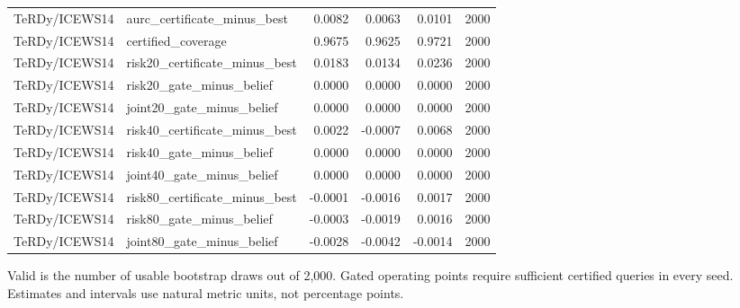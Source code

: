 \begin{longtable}{llrrrr}
TeRDy/ICEWS14 & aurc\_certificate\_minus\_best & 0.0082 & 0.0063 & 0.0101 & 2000\\
TeRDy/ICEWS14 & certified\_coverage & 0.9675 & 0.9625 & 0.9721 & 2000\\
TeRDy/ICEWS14 & risk20\_certificate\_minus\_best & 0.0183 & 0.0134 & 0.0236 & 2000\\
TeRDy/ICEWS14 & risk20\_gate\_minus\_belief & 0.0000 & 0.0000 & 0.0000 & 2000\\
TeRDy/ICEWS14 & joint20\_gate\_minus\_belief & 0.0000 & 0.0000 & 0.0000 & 2000\\
TeRDy/ICEWS14 & risk40\_certificate\_minus\_best & 0.0022 & -0.0007 & 0.0068 & 2000\\
TeRDy/ICEWS14 & risk40\_gate\_minus\_belief & 0.0000 & 0.0000 & 0.0000 & 2000\\
TeRDy/ICEWS14 & joint40\_gate\_minus\_belief & 0.0000 & 0.0000 & 0.0000 & 2000\\
TeRDy/ICEWS14 & risk80\_certificate\_minus\_best & -0.0001 & -0.0016 & 0.0017 & 2000\\
TeRDy/ICEWS14 & risk80\_gate\_minus\_belief & -0.0003 & -0.0019 & 0.0016 & 2000\\
TeRDy/ICEWS14 & joint80\_gate\_minus\_belief & -0.0028 & -0.0042 & -0.0014 & 2000\\
\bottomrule\end{longtable}\normalsize
Valid is the number of usable bootstrap draws out of 2,000. Gated operating points require sufficient certified queries in every seed. Estimates and intervals use natural metric units, not percentage points.
